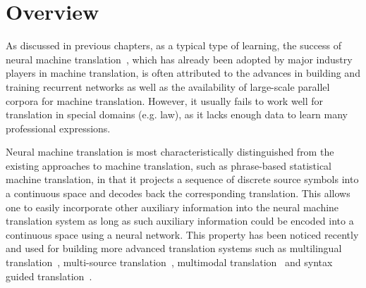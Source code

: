 \section{Overview}

As discussed in previous chapters, as a typical type of \sts learning,
the success of neural machine translation~\citep{bahdanau2014neural}, which has already been adopted by major industry players in machine translation\citep{wu2016google,crego2016systran,hassan-hp}, is often attributed to the advances in building and training recurrent networks as well as the availability of large-scale parallel corpora for machine translation. However, it usually fails to work well for translation in special domains (e.g. law),  as it lacks enough data to learn many professional expressions.

Neural machine translation is most characteristically distinguished from the existing approaches to machine translation, such as phrase-based statistical machine translation\citep{koehn2003statistical}, in that it projects a sequence of discrete source symbols into a continuous space and decodes back the corresponding translation. This allows one to easily incorporate other auxiliary information into the neural machine translation system as long as such auxiliary information could be encoded into a continuous space using a neural network. This property has been noticed recently and used for building more advanced translation systems such as multilingual translation~\citep{firat2016multi,luong2015multi}, multi-source translation~\citep{zoph2016multi,firat2016zero}, multimodal translation~\citep{caglayan2016does} and syntax guided translation~\citep{nadejde2017syntax,eriguchi2017learning}. 

